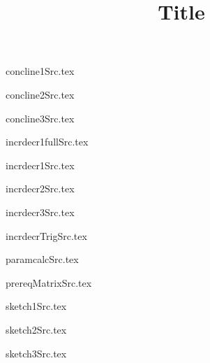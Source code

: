 \documentclass{article}
\title{Title}
\begin{document}

concline1Src.tex



concline2Src.tex



concline3Src.tex



incrdecr1fullSrc.tex



incrdecr1Src.tex



incrdecr2Src.tex



incrdecr3Src.tex



incrdecrTrigSrc.tex



paramcalcSrc.tex



prereqMatrixSrc.tex



sketch1Src.tex



sketch2Src.tex



sketch3Src.tex


\end{document}
